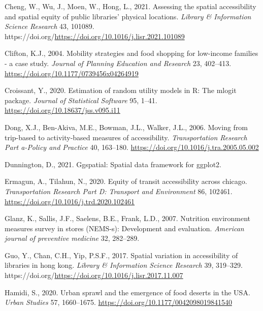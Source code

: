 \documentclass[3p, authoryear, review]{elsarticle} %
\newlength{\cslhangindent}
\newenvironment{CSLReferences}[2] %
 {%
  \setlength{\parindent}{0pt}
  \ifodd #1 \everypar{\setlength{\hangindent}{\cslhangindent}}\ignorespaces\fi
  \ifnum #2 > 0
  \setlength{\parskip}{#2\baselineskip}
  \fi
 }%
 {}
\begin{document}
\begin{CSLReferences}{1}{0}
\leavevmode{}%
Cheng, W., Wu, J., Moen, W., Hong, L., 2021. Assessing the spatial accessibility and spatial equity of public libraries' physical locations. \emph{Library \& Information Science Research} 43, 101089. https://doi.org/\url{https://doi.org/10.1016/j.lisr.2021.101089}

\leavevmode{}%
Clifton, K.J., 2004. Mobility strategies and food shopping for low-income families - a case study. \emph{Journal of Planning Education and Research} 23, 402--413. \url{https://doi.org/10.1177/0739456x04264919}

\leavevmode{}%
Croissant, Y., 2020. Estimation of random utility models in {R}: The {mlogit} package. \emph{Journal of Statistical Software} 95, 1--41. \url{https://doi.org/10.18637/jss.v095.i11}

\leavevmode{}%
Dong, X.J., Ben-Akiva, M.E., Bowman, J.L., Walker, J.L., 2006. Moving from trip-based to activity-based measures of accessibility. \emph{Transportation Research Part a-Policy and Practice} 40, 163--180. \url{https://doi.org/10.1016/j.tra.2005.05.002}

\leavevmode{}%
Dunnington, D., 2021. Ggspatial: Spatial data framework for ggplot2.

\leavevmode{}%
Ermagun, A., Tilahun, N., 2020. Equity of transit accessibility across chicago. \emph{Transportation Research Part D: Transport and Environment} 86, 102461. \url{https://doi.org/10.1016/j.trd.2020.102461}

\leavevmode{}%
Glanz, K., Sallis, J.F., Saelens, B.E., Frank, L.D., 2007. Nutrition environment measures survey in stores (NEMS-s): Development and evaluation. \emph{American journal of preventive medicine} 32, 282--289.

\leavevmode{}%
Guo, Y., Chan, C.H., Yip, P.S.F., 2017. Spatial variation in accessibility of libraries in hong kong. \emph{Library \& Information Science Research} 39, 319--329. https://doi.org/\url{https://doi.org/10.1016/j.lisr.2017.11.007}

\leavevmode{}%
Hamidi, S., 2020. Urban sprawl and the emergence of food deserts in the USA. \emph{Urban Studies} 57, 1660--1675. \url{https://doi.org/10.1177/0042098019841540}


\end{CSLReferences}
\end{document}
